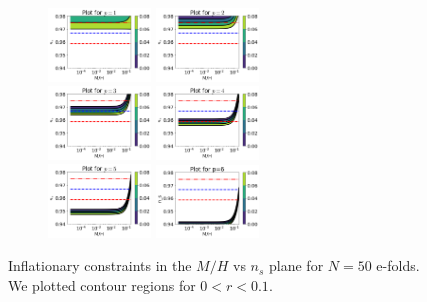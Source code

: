 \documentclass[amssymb,twocolumn,prd,nofootinbib,showpacs]{revtex4-1}
\begin{document}
\begin{figure}[h!]
\raggedright
\begin{subfigure}[b]{0.6\textwidth}
\includegraphics[width=0.3\textwidth]{p150.png}
\includegraphics[width=0.3\textwidth]{p250.png}\\
\includegraphics[width=0.3\textwidth]{p350.png}
\includegraphics[width=0.3\textwidth]{p450.png}\\
\includegraphics[width=0.3\textwidth]{p550.png}
\includegraphics[width=0.3\textwidth]{p650.png}
\label{curv50}
\end{subfigure}
\caption{Inflationary constraints in the $M/H$ vs $n_s$ plane for $N=50$ e-folds. We plotted contour regions for $0<r<0.1$.}

\end{figure}
\end{document}
